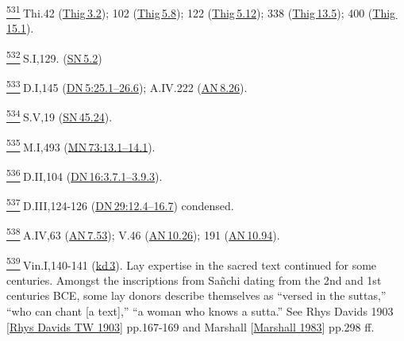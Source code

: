 \label{footprints_split_025.html_fn531}
\hyperref[footprints_split_014.htmlux5cux23fnref531]{\textsuperscript{531}} Thi.42
(\href{https://suttacentral.net/thig3.2/en/sujato}{Thig\,3.2}); 102
(\href{https://suttacentral.net/thig5.8/en/sujato}{Thig\,5.8}); 122
(\href{https://suttacentral.net/thig5.12/en/sujato}{Thig\,5.12}); 338
(\href{https://suttacentral.net/thig13.5/en/sujato}{Thig\,13.5}); 400
(\href{https://suttacentral.net/thig15.1/en/sujato}{Thig\,15.1}).

\label{footprints_split_025.html_fn532}
\hyperref[footprints_split_014.htmlux5cux23fnref532]{\textsuperscript{532}} S.I,129.
(\href{https://suttacentral.net/sn5.2/en/sujato}{SN\,5.2})

\label{footprints_split_025.html_fn533}
\hyperref[footprints_split_014.htmlux5cux23fnref533]{\textsuperscript{533}} D.I,145
(\href{https://suttacentral.net/dn5/en/sujato\#25.1}{DN\,5:25.1--26.6});
A.IV.222 (\href{https://suttacentral.net/an8.26/en/sujato}{AN\,8.26}).

\label{footprints_split_025.html_fn534}
\hyperref[footprints_split_014.htmlux5cux23fnref534]{\textsuperscript{534}} S.V,19
(\href{https://suttacentral.net/sn45.24/en/sujato}{SN\,45.24}).

\label{footprints_split_025.html_fn535}
\hyperref[footprints_split_014.htmlux5cux23fnref535]{\textsuperscript{535}} M.I,493
(\href{https://suttacentral.net/mn73/en/sujato\#13.1}{MN\,73:13.1--14.1}).

\label{footprints_split_025.html_fn536}
\hyperref[footprints_split_014.htmlux5cux23fnref536]{\textsuperscript{536}} D.II,104
(\href{https://suttacentral.net/dn16/en/sujato\#3.7.1}{DN\,16:3.7.1--3.9.3}).

\label{footprints_split_025.html_fn537}
\hyperref[footprints_split_014.htmlux5cux23fnref537]{\textsuperscript{537}} D.III,124-126
(\href{https://suttacentral.net/dn29/en/sujato\#12.4}{DN\,29:12.4--16.7})
condensed.

\label{footprints_split_025.html_fn538}
\hyperref[footprints_split_014.htmlux5cux23fnref538]{\textsuperscript{538}} A.IV,63
(\href{https://suttacentral.net/an7.53/en/sujato}{AN\,7.53}); V.46
(\href{https://suttacentral.net/an10.26/en/sujato}{AN\,10.26}); 191
(\href{https://suttacentral.net/an10.94/en/sujato}{AN\,10.94}).

\label{footprints_split_025.html_fn539}
\hyperref[footprints_split_014.htmlux5cux23fnref539]{\textsuperscript{539}} Vin.I,140-141
(\href{https://suttacentral.net/pli-tv-kd3/en/brahmali\#5.9.1}{kd\,3}).
Lay expertise in the sacred text continued for some centuries. Amongst
the inscriptions from Sañchi dating from the 2{nd} and 1{st} centuries
BCE, some lay donors describe themselves as ``versed in the suttas,''
``who can chant {[}a text{]},'' ``a woman who knows a sutta.'' See {Rhys
Davids 1903
{{[}\hyperref[footprints_split_022.htmlux5cux23Rhysux5cux2520Davidsux5cux2520TWux5cux25201903]{Rhys
Davids TW 1903}{]}}} pp.167-169 and {Marshall
{{[}\hyperref[footprints_split_022.htmlux5cux23Marshallux5cux25201983]{Marshall
1983}{]}}} pp.298 ff.

